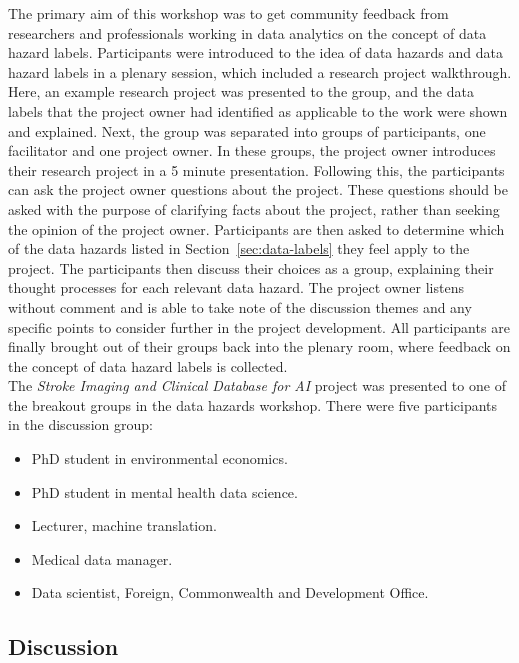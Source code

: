 \documentclass{article}
\begin{document}
The primary aim of this workshop was to get community feedback from
researchers and professionals working in data analytics on the concept
of data hazard labels.
Participants were introduced to the idea of data hazards and data
hazard labels in a plenary session, which included a research project
walkthrough. Here, an example research project was presented to the
group, and the data labels that the project owner had identified as
applicable to the work were shown and explained.
Next, the group was separated into groups of participants, one
facilitator and one project owner.
In these groups, the project owner introduces their research project
in a 5 minute presentation. Following this, the participants can ask
the project owner questions about the project. These questions should
be asked with the purpose of clarifying facts about the project,
rather than seeking the opinion of the project owner.
Participants are then asked to determine which of the data hazards
listed in Section~\ref{sec:data-labels} they feel apply to the
project. The participants then discuss their choices as a group,
explaining their thought processes for each relevant data hazard.
The project owner listens without comment and is able to take note of
the discussion themes and any specific points to consider further in
the project development. All participants are finally brought out of
their groups back into the plenary room, where feedback on the concept
of data hazard labels is collected. \\

The \textit{Stroke Imaging and Clinical Database for AI} project was
presented to one of the breakout groups in the data hazards workshop.
There were five participants in the discussion group:

\begin{itemize}
\item PhD student in environmental economics.
\item PhD student in mental health data science.
\item Lecturer, machine translation.
\item Medical data manager.
\item Data scientist, Foreign, Commonwealth and Development Office.
\end{itemize}


\subsection{Discussion}
\end{document}
